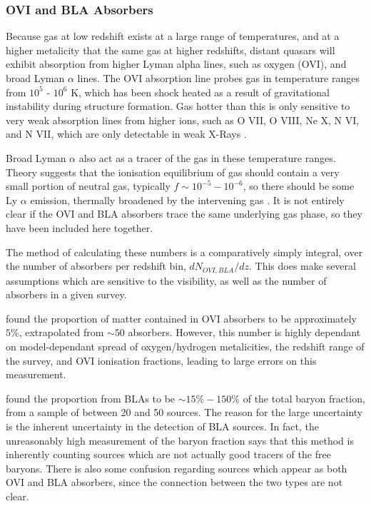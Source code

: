 \subsubsection{OVI and BLA Absorbers}

Because gas at low redshift exists at a large range of temperatures, and at a higher metalicity that the same gas at higher redshifts, distant quasars will exhibit absorption from higher Lyman alpha lines, such as oxygen (OVI), and broad Lyman $\alpha$ lines. The OVI absorption line probes gas in temperature ranges from $10^5$ - $10^6$ K, which has been shock heated as a result of gravitational instability during structure formation. Gas hotter than this is only sensitive to very weak absorption lines from higher ions, such as O VII, O VIII, Ne X, N VI, and N VII, which are only detectable in weak X-Rays \citep{2005ApJ...624..555D}. 
\par Broad Lyman $\alpha$ also act as a tracer of the gas in these temperature ranges. Theory suggests that the ionisation equilibrium of gas should contain a very small portion of neutral gas, typically $f \sim 10^{-5} - 10^{-6}$, so there should be some Ly $\alpha$ emission, thermally broadened by the intervening gas \citep{2006A&A...445..827R}. It is not entirely clear if the OVI and BLA absorbers trace the same underlying gas phase, so they have been included here together. 
\par The method of calculating these numbers is a comparatively simply integral, over the number of absorbers per redshift bin, $dN_{OVI,BLA}/dz$. This does make several assumptions which are sensitive to the visibility, as well as the number of absorbers in a given survey. \par \cite{2005ApJ...624..555D} found the proportion of matter contained in OVI absorbers to be approximately $5\%$, extrapolated from $\sim 50$ absorbers. However, this number is highly dependant on model-dependant spread of oxygen/hydrogen metalicities, the redshift range of the survey, and OVI ionisation fractions, leading to large errors on this measurement. 
\par \cite{2006A&A...445..827R} found the proportion from BLAs to be $\sim 15 \% - 150 \%$ of the total baryon fraction, from a sample of between 20 and 50 sources. The reason for the large uncertainty is the inherent uncertainty in the detection of BLA sources. In fact, the unreasonably high measurement of the baryon fraction says that this method is inherently counting sources which are not actually good tracers of the free baryons. There is also some confusion regarding sources which appear as both OVI and BLA absorbers, since the connection between the two types are not clear. 

